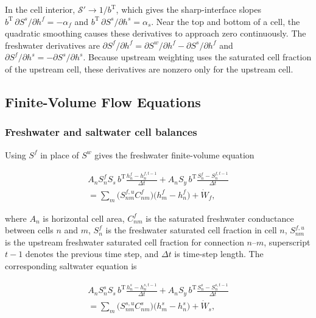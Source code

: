 \noindent In the cell interior, $\mathcal{S}'\to 1/b^{\mathrm{T}}$, which gives the sharp-interface slopes $b^{\mathrm{T}}\,\partial S^{s}/\partial h^{f}=-\alpha_{f}$ and $b^{\mathrm{T}}\,\partial S^{s}/\partial h^{s}=\alpha_{s}$. Near the top and bottom of a cell, the quadratic smoothing causes these derivatives to approach zero continuously. The freshwater derivatives are $\partial S^{f}/\partial h^{f}=\partial S^{w}/\partial h^{f}-\partial S^{s}/\partial h^{f}$ and $\partial S^{f}/\partial h^{s}=-\partial S^{s}/\partial h^{s}$. Because upstream weighting uses the saturated cell fraction of the upstream cell, these derivatives are nonzero only for the upstream cell.

\subsection{Finite-Volume Flow Equations}

\subsubsection{Freshwater and saltwater cell balances}

Using $S^{f}$ in place of $S^{w}$ gives the freshwater finite-volume equation

\begin{multline}
\label{eqn:swi-fvf}
A_{n}S_{n}^{f}S_{s}\,b^{\mathrm{T}}\frac{h_{n}^{f}-h_{n}^{f,t-1}}{\Delta t}
+A_{n}S_{y}\,b^{\mathrm{T}}\frac{S_{n}^{f}-S_{n}^{f,t-1}}{\Delta t}\\
=\sum_{m}\big(S_{nm}^{f,u}C_{nm}^{f}\big)\big(h_{m}^{f}-h_{n}^{f}\big)+\dot W_{f},
\end{multline}

\noindent where $A_{n}$ is horizontal cell area, $C_{nm}^{f}$ is the saturated freshwater conductance between cells $n$ and $m$, $S_{n}^{f}$ is the freshwater saturated cell fraction in cell $n$, $S_{nm}^{f,u}$ is the upstream freshwater saturated cell fraction for connection $n$--$m$, superscript $t-1$ denotes the previous time step, and $\Delta t$ is time-step length. The corresponding saltwater equation is

\begin{multline}
\label{eqn:swi-fvs}
A_{n}S_{n}^{s}S_{s}\,b^{\mathrm{T}}\frac{h_{n}^{s}-h_{n}^{s,t-1}}{\Delta t}
+A_{n}S_{y}\,b^{\mathrm{T}}\frac{S_{n}^{s}-S_{n}^{s,t-1}}{\Delta t}\\
=\sum_{m}\big(S_{nm}^{s,u}C_{nm}^{s}\big)\big(h_{m}^{s}-h_{n}^{s}\big)+\dot W_{s},
\end{multline}

